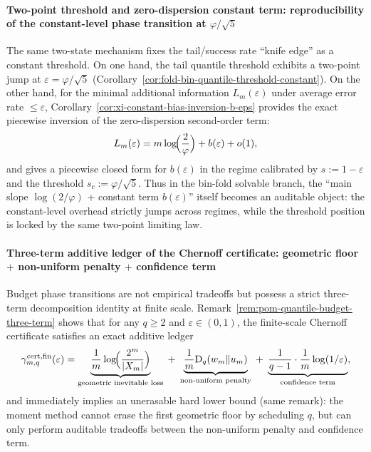 \paragraph{Two-point threshold and zero-dispersion constant term: reproducibility of the constant-level phase transition at \texorpdfstring{$\varphi/\sqrt5$}{phi/sqrt5}}
The same two-state mechanism fixes the tail/success rate ``knife edge'' as a constant threshold.
On one hand, the tail quantile threshold exhibits a two-point jump at \(\varepsilon=\varphi/\sqrt5\) (Corollary~\ref{cor:fold-bin-quantile-threshold-constant}).
On the other hand, for the minimal additional information \(L_m(\varepsilon)\) under average error rate \(\le\varepsilon\), Corollary~\ref{cor:xi-constant-bias-inversion-b-eps} provides the exact piecewise inversion of the zero-dispersion second-order term:
\[
L_m(\varepsilon)=m\log\!\Bigl(\frac{2}{\varphi}\Bigr)+b(\varepsilon)+o(1),
\]
and gives a piecewise closed form for \(b(\varepsilon)\) in the regime calibrated by \(s:=1-\varepsilon\) and the threshold \(s_c:=\varphi/\sqrt5\).
Thus in the bin-fold solvable branch, the ``main slope \(\log(2/\varphi)\) + constant term \(b(\varepsilon)\)'' itself becomes an auditable object: the constant-level overhead strictly jumps across regimes, while the threshold position is locked by the same two-point limiting law.

\paragraph{Three-term additive ledger of the Chernoff certificate: geometric floor \texorpdfstring{$+$}{+} non-uniform penalty \texorpdfstring{$+$}{+} confidence term}
Budget phase transitions are not empirical tradeoffs but possess a strict three-term decomposition identity at finite scale.
Remark~\ref{rem:pom-quantile-budget-three-term} shows that for any \(q\ge 2\) and \(\varepsilon\in(0,1)\), the finite-scale Chernoff certificate satisfies an exact additive ledger
\[
\gamma^{\mathrm{cert,fin}}_{m,q}(\varepsilon)
=
\underbrace{\frac{1}{m}\log\!\Bigl(\frac{2^m}{|X_m|}\Bigr)}_{\text{geometric inevitable loss}}
\;+\;
\underbrace{\frac{1}{m}\mathrm{D}_q(w_m\Vert u_m)}_{\text{non-uniform penalty}}
\;+\;
\underbrace{\frac{1}{q-1}\cdot\frac{1}{m}\log(1/\varepsilon)}_{\text{confidence term}},
\]
and immediately implies an unerasable hard lower bound (same remark): the moment method cannot erase the first geometric floor by scheduling \(q\), but can only perform auditable tradeoffs between the non-uniform penalty and confidence term.

